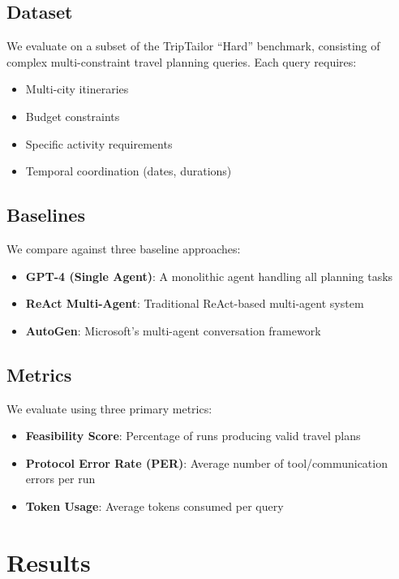 \documentclass[11pt,a4paper]{article}
\begin{document}
\subsection{Dataset}
We evaluate on a subset of the TripTailor ``Hard'' benchmark, consisting of complex multi-constraint travel planning queries. Each query requires:
\begin{itemize}
    \item Multi-city itineraries
    \item Budget constraints
    \item Specific activity requirements
    \item Temporal coordination (dates, durations)
\end{itemize}

\subsection{Baselines}
We compare against three baseline approaches:
\begin{itemize}
    \item \textbf{GPT-4 (Single Agent)}: A monolithic agent handling all planning tasks
    \item \textbf{ReAct Multi-Agent}: Traditional ReAct-based multi-agent system
    \item \textbf{AutoGen}: Microsoft's multi-agent conversation framework
\end{itemize}

\subsection{Metrics}
We evaluate using three primary metrics:
\begin{itemize}
    \item \textbf{Feasibility Score}: Percentage of runs producing valid travel plans
    \item \textbf{Protocol Error Rate (PER)}: Average number of tool/communication errors per run
    \item \textbf{Token Usage}: Average tokens consumed per query
\end{itemize}

\section{Results}
\end{document}
